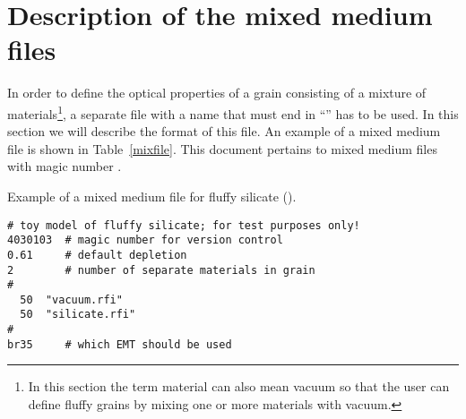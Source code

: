 \section{Description of the mixed medium files}
\label{mix:descr}

In order to define the optical properties of a grain consisting of a mixture
of materials\footnote{In this section the term material can also mean vacuum
  so that the user can define fluffy grains by mixing one or more materials
  with vacuum.}, a separate file with a name that must end in
``'' has to be used. In this section we will describe the format
of this file. An example of a mixed medium file is shown in
Table~\ref{mixfile}. This document pertains to mixed medium files with magic
number .

\begin{table}
\caption[Example of a mixed medium file for fluffy silicate.]
{Example of a mixed medium file for fluffy silicate ().}
\label{mixfile}
\begin{verbatim}
# toy model of fluffy silicate; for test purposes only!
4030103  # magic number for version control
0.61     # default depletion
2        # number of separate materials in grain
#
  50  "vacuum.rfi"
  50  "silicate.rfi"
#
br35     # which EMT should be used
\end{verbatim}
\end{table}

